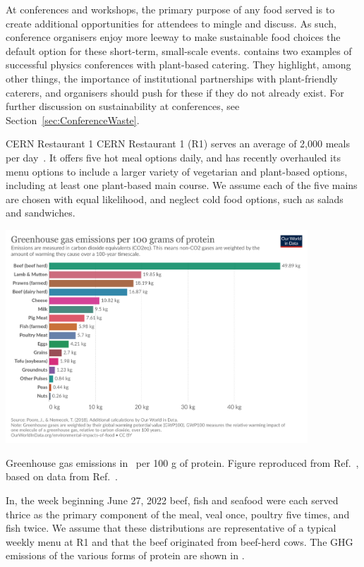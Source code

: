 \documentclass[../SustainableHEP.tex]{subfiles}
\begin{document}
At conferences and workshops, the primary purpose of any food served is to create additional opportunities for attendees to mingle and discuss.  As such, conference organisers enjoy more leeway to make sustainable food choices the default option for these short-term, small-scale events.   contains two examples of successful physics conferences with plant-based catering. They highlight, among other things, the importance of institutional partnerships with plant-friendly caterers, and organisers should push for these if they do not already exist.  For further discussion on sustainability at conferences, see Section~\ref{sec:ConferenceWaste}.

\begin{casestudy}{CERN Restaurant 1}%
    CERN Restaurant 1 (R1) serves an average of 2,000 meals per day~\cite{CERNACCUMeeting}. It offers five hot meal options daily, and has recently overhauled its menu options to include a larger variety of vegetarian and plant-based options, including at least one plant-based main course.  We assume each of the five mains are chosen with equal likelihood, and neglect cold food options, such as salads and sandwiches.

    \begin{center}
        \captionsetup{type=figure}
        \includegraphics[width=0.85\textwidth]{Sections/Figs/Food/Emissions-protein.png}
        \caption[GHG emissions per 100 g of protein]{Greenhouse gas emissions in \CdOe\ per 100 g of protein. Figure reproduced from Ref.~\cite{OWID-Food}, based on data from Ref.~\cite{PooreNemecek2018}.}
        \label{fig:ghg-per-protein}
    \end{center}

    In, \eg the week beginning June 27, 2022 beef, fish and seafood were each served thrice as the primary component of the meal, veal once, poultry five times, and fish twice.  We assume that these distributions are representative of a typical weekly menu at R1 and that the beef originated from beef-herd cows. The GHG emissions of the various forms of protein are shown in .


\end{casestudy}
\end{document}
